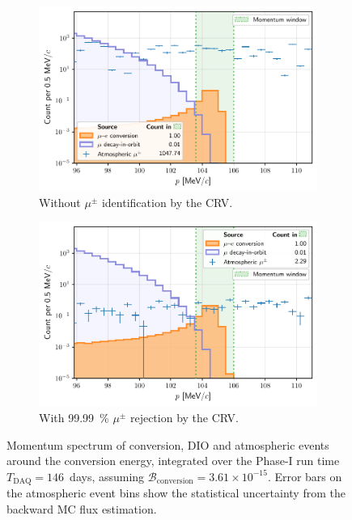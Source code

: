 \begin{figure}
    \begin{subfigure}[t]{0.49\textwidth}
        \centering
        \includegraphics[width=\textwidth]{
            chapter6/thesis_conversion_search_momentum_distribution_nocrv.pdf}
            \caption{ Without $\mu^\pm$ identification by the CRV. }
        \label{fig:log_spectrum_nocuts}
    \end{subfigure}
    \hfill
    \begin{subfigure}[t]{0.49\textwidth}
        \centering
        \includegraphics[width=\textwidth]{chapter6/thesis_conversion_search_momentum_distribution_withcuts_except_directionID.pdf}
        \caption{ With \SI{99.99}{\percent} $\mu^\pm$ rejection by the CRV. }
        \label{fig:log_spectrum_cuts_except_directionID}
    \end{subfigure}
    \caption[Momentum spectrum of conversion, DIO and atmospheric events around
    the conversion energy]{ Momentum spectrum of conversion, DIO and atmospheric
    events around the conversion energy, integrated over the Phase-I run time
    $T_\mathrm{DAQ} = 146$~days, assuming $\mathcal{B}_\mathrm{conversion} =
    3.61\times 10^{-15}$. Error bars on the atmospheric event bins show the
    statistical uncertainty from the backward MC flux estimation.
    }
    \label{fig:log_spectra}
\end{figure}



